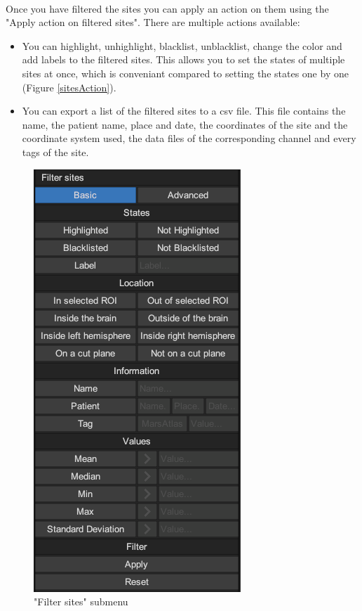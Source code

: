 \documentclass[a4paper]{article}
\begin{document}
\paragraph{} Once you have filtered the sites you can apply an action on them using the "Apply action on filtered sites". There are multiple actions available:
\begin{itemize}
\item You can highlight, unhighlight, blacklist, unblacklist, change the color and add labels to the filtered sites. This allows you to set the states of multiple sites at once, which is conveniant compared to setting the states one by one (Figure \ref{sitesAction}).
\item You can export a list of the filtered sites to a csv file. This file contains the name, the patient name, place and date, the coordinates of the site and the coordinate system used, the data files of the corresponding channel and every tags of the site.
\end{itemize}
\begin{figure}[H]
\begin{center}
\includegraphics[scale=0.5]{BasicStates.png}
\end{center}
\caption{\label{basicStates}"Filter sites" submenu}
\end{figure}
\end{document}
